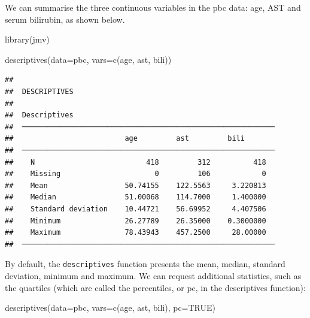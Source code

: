 \documentclass[
]{memoir}
\newenvironment{Shaded}{\begin{snugshade}}{\end{snugshade}}
\newcommand{\AttributeTok}[1]{\textcolor[rgb]{0.77,0.63,0.00}{#1}}
\newcommand{\ConstantTok}[1]{\textcolor[rgb]{0.00,0.00,0.00}{#1}}
\newcommand{\FunctionTok}[1]{\textcolor[rgb]{0.00,0.00,0.00}{#1}}
\newcommand{\NormalTok}[1]{#1}
\begin{document}
We can summarise the three continuous variables in the pbc data: age, AST and serum bilirubin, as shown below.

\begin{Shaded}
\begin{Highlighting}[]
\FunctionTok{library}\NormalTok{(jmv)}

\FunctionTok{descriptives}\NormalTok{(}\AttributeTok{data=}\NormalTok{pbc, }\AttributeTok{vars=}\FunctionTok{c}\NormalTok{(age, ast, bili))}
\end{Highlighting}
\end{Shaded}

\begin{verbatim}
## 
##  DESCRIPTIVES
## 
##  Descriptives                                                
##  ─────────────────────────────────────────────────────────── 
##                          age         ast         bili        
##  ─────────────────────────────────────────────────────────── 
##    N                          418         312          418   
##    Missing                      0         106            0   
##    Mean                  50.74155    122.5563     3.220813   
##    Median                51.00068    114.7000     1.400000   
##    Standard deviation    10.44721    56.69952     4.407506   
##    Minimum               26.27789    26.35000    0.3000000   
##    Maximum               78.43943    457.2500     28.00000   
##  ───────────────────────────────────────────────────────────
\end{verbatim}

By default, the \texttt{descriptives} function presents the mean, median, standard deviation, minimum and maximum. We can request additional statistics, such as the quartiles (which are called the percentiles, or pc, in the descriptives function):

\begin{Shaded}
\begin{Highlighting}[]
\FunctionTok{descriptives}\NormalTok{(}\AttributeTok{data=}\NormalTok{pbc, }\AttributeTok{vars=}\FunctionTok{c}\NormalTok{(age, ast, bili), }\AttributeTok{pc=}\ConstantTok{TRUE}\NormalTok{)}
\end{Highlighting}
\end{Shaded}
\end{document}
